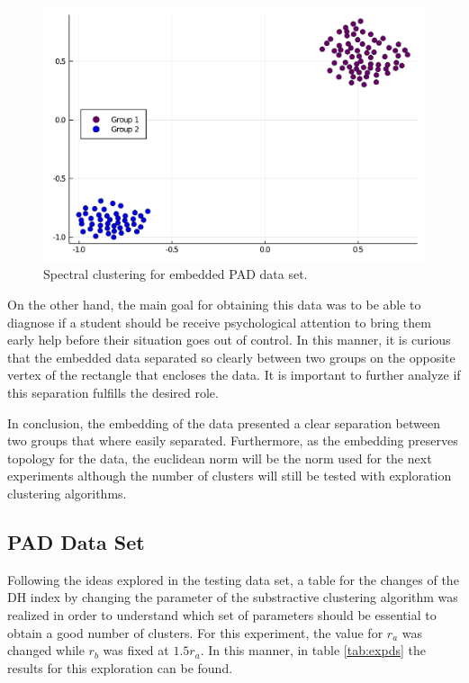 \documentclass[conference]{IEEEtran}
\theoremstyle{definition}
\theoremstyle{remark}
\theoremstyle{remark}
\begin{document}
\begin{figure}[t]
  \centering
  \includegraphics[scale=.35]{figs/real/emb-spectral-clustering}
  \caption{Spectral clustering for embedded PAD data set.}
  \label{fig:embdssc}
\end{figure}

On the other hand, the main goal for obtaining this data was to be able to
diagnose if a student should be receive psychological attention to bring them
early help before their situation goes out of control. In this manner, it is
curious that the embedded data separated so clearly between two groups on the
opposite vertex of the rectangle that encloses the data. It is important to
further analyze if this separation fulfills the desired role.

In conclusion, the embedding of the data presented a clear separation between
two groups that where easily separated. Furthermore, as the embedding preserves
topology for the data, the euclidean norm will be the norm used for the next
experiments although the number of clusters will still be tested with
exploration clustering algorithms.

\subsection{PAD Data Set}

Following the ideas explored in the testing data set, a table for the changes of
the DH index by changing the parameter of the substractive clustering algorithm
was realized in order to understand which set of parameters should be essential
to obtain a good number of clusters. For this experiment, the value for $r_{a}$
was changed while $r_{b}$ was fixed at $1.5r_{a}$. In this manner, in table
\ref{tab:expds} the results for this exploration can be found.
\end{document}
